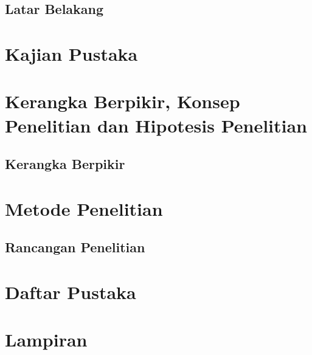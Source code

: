 \documentclass[12pt, a4paper]{book}
\begin{document}
\section{Latar Belakang}

\chapter{Kajian Pustaka}

\chapter{Kerangka Berpikir, Konsep Penelitian dan Hipotesis Penelitian}
\section{Kerangka Berpikir}

\chapter{Metode Penelitian}
\section{Rancangan Penelitian}

\backmatter

\chapter*{Daftar Pustaka}


\chapter*{Lampiran}
\end{document}

